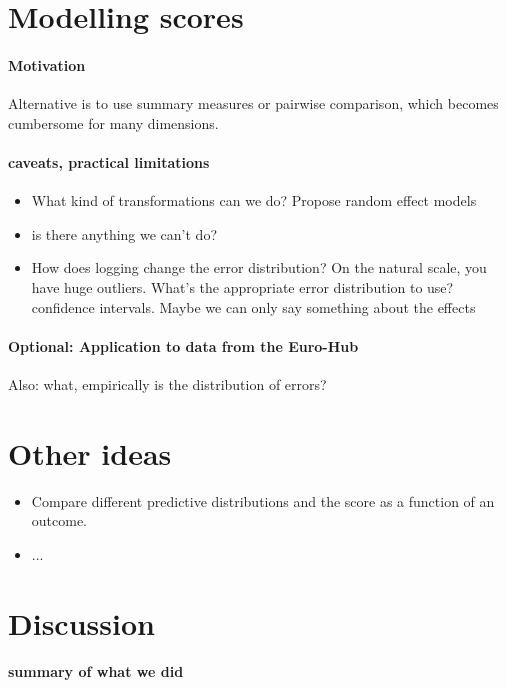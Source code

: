 \documentclass{article}
\begin{document}
\section{Modelling scores}
\paragraph{Motivation} Alternative is to use summary measures or pairwise comparison, which becomes cumbersome for many dimensions. 

\paragraph{caveats, practical limitations}
\begin{itemize}
    \item What kind of transformations can we do? Propose random effect models
    \item is there anything we can't do? 
    \item How does logging change the error distribution? On the natural scale, you have huge outliers. What's the appropriate error distribution to use? confidence intervals. Maybe we can only say something about the effects
\end{itemize}


\paragraph{Optional: Application to data from the Euro-Hub}
Also: what, empirically is the distribution of errors? 

\section{Other ideas}
\begin{itemize}
    \item Compare different predictive distributions and the score as a function of an outcome.
    \item ...
\end{itemize}




\section{Discussion}

\paragraph{summary of what we did}
\end{document}
